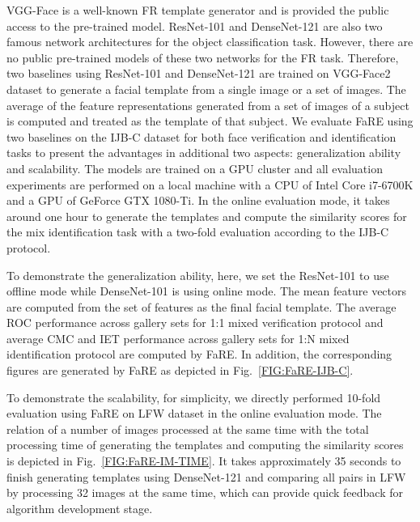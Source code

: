 \documentclass{article}
\begin{document}
VGG-Face \cite{Parkhi_2015_16638} is a well-known FR template generator and is provided the public access to the pre-trained model.
ResNet-101 \cite{He_2016_17161} and DenseNet-121 \cite{Huang_2017_190102} are also two famous network architectures for the object classification task.
However, there are no public pre-trained models of these two networks for the FR task.
Therefore, two baselines using ResNet-101 and DenseNet-121 are trained on VGG-Face2 dataset to generate a facial template from a single image or a set of images.
The average of the feature representations generated from a set of images of a subject is computed and treated as the template of that subject.
We evaluate FaRE using two baselines on the IJB-C \cite{Maze_2018_180930} dataset for both face verification and identification tasks to present the advantages in additional two aspects: generalization ability and scalability.
The models are trained on a GPU cluster and all evaluation experiments are performed on a local machine with a CPU of Intel Core i7-6700K and a GPU of GeForce GTX 1080-Ti.
In the online evaluation mode, it takes around one hour to generate the templates and compute the similarity scores for the mix identification task with a two-fold evaluation according to the IJB-C protocol.

To demonstrate the generalization ability, here, we set the ResNet-101 to use offline mode while DenseNet-101 is using online mode.
The mean feature vectors are computed from the set of features as the final facial template.
The average ROC performance across gallery sets for 1:1 mixed verification protocol and average CMC and IET performance across gallery sets for 1:N mixed identification protocol are computed by FaRE.
In addition, the corresponding figures are generated by FaRE as depicted in Fig.~\ref{FIG:FaRE-IJB-C}.

To demonstrate the scalability, for simplicity, we directly performed 10-fold evaluation using FaRE on LFW dataset in the online evaluation mode.
The relation of a number of images processed at the same time with the total processing time of generating the templates and computing the similarity scores is depicted in Fig.~\ref{FIG:FaRE-IM-TIME}.
It takes approximately 35 seconds to finish generating templates using DenseNet-121 and comparing all pairs in LFW by processing 32 images at the same time, which can provide quick feedback for algorithm development stage.
\end{document}
